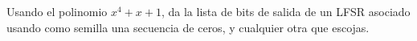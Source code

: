 Usando el polinomio $x^4+x+1$, da la lista de bits de salida de un LFSR asociado usando como semilla una secuencia de ceros, y cualquier otra que escojas.